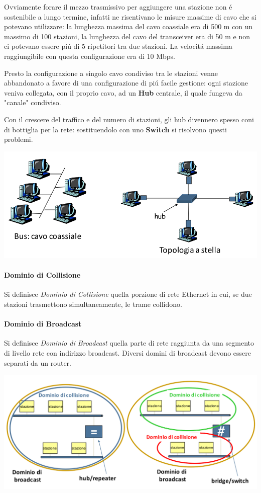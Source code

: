 \documentclass[12pt]{article}
\begin{document}
Ovviamente forare il mezzo trasmissivo per aggiungere una stazione non \'e sostenibile a lungo termine, infatti ne 
risentivano le misure massime di cavo che si potevano utilizzare: la lunghezza massima del cavo coassiale era di 500 m con un 
massimo di 100 stazioni, la lunghezza del cavo del transceiver era di 50 m e non ci potevano essere pi\'u di 5 ripetitori tra 
due stazioni. La velocit\'a massima raggiungibile con questa configurazione era di 10 Mbps.

Presto la configurazione a singolo cavo condiviso tra le stazioni venne abbandonato a favore di una configurazione di 
pi\'u facile gestione: ogni stazione veniva collegata, con il proprio cavo, ad un \textbf{Hub} centrale, il quale fungeva da 
"canale" condiviso.

Con il crescere del traffico e del numero di stazioni, gli hub divennero spesso coni di bottiglia per la rete: sostituendolo
con uno \textbf{Switch} si risolvono questi problemi.
\begin{center}
	\includegraphics[scale=0.4]{livello_collegamento-img11.png}
\end{center}

\paragraph{Dominio di Collisione} Si definisce \textit{Dominio di Collisione} quella porzione di rete Ethernet in cui, se 
due stazioni trasmettono simultaneamente, le trame collidono.

\paragraph{Dominio di Broadcast} Si definisce \textit{Dominio di Broadcast} quella parte di rete raggiunta da una segmento di 
livello rete con indirizzo broadcast. Diversi domini di broadcast devono essere separati da un router.
\begin{center}
	\includegraphics[scale=0.4]{livello_collegamento-img12.png}
\end{center}
\end{document}
